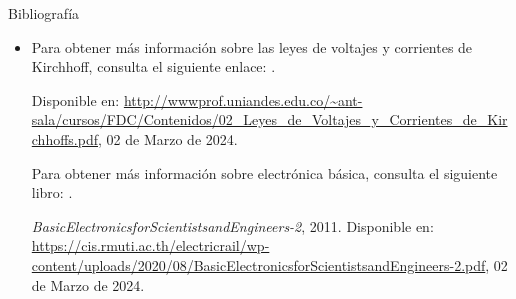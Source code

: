 \documentclass[svgnames, aspectratio=169]{beamer}
\begin{document}
\begin{frame}{Bibliografía}
\begin{itemize}
    \item 

Para obtener más información sobre las leyes de voltajes y corrientes de Kirchhoff, consulta el siguiente enlace: \cite{Kirchhoff_Leyes}.

\begin{thebibliography}{9}
Disponible en: \url{http://wwwprof.uniandes.edu.co/~ant-sala/cursos/FDC/Contenidos/02_Leyes_de_Voltajes_y_Corrientes_de_Kirchhoffs.pdf}, 02 de Marzo de 2024.
\end{thebibliography}





Para obtener más información sobre electrónica básica, consulta el siguiente libro: \cite{libro_electronica}.

\begin{thebibliography}{9}
\textit{BasicElectronicsforScientistsandEngineers-2}, 2011. Disponible en: \url{https://cis.rmuti.ac.th/electricrail/wp-content/uploads/2020/08/BasicElectronicsforScientistsandEngineers-2.pdf}, 02 de Marzo de 2024.
\end{thebibliography}


\end{itemize}
    




    
\end{frame}
\end{document}
